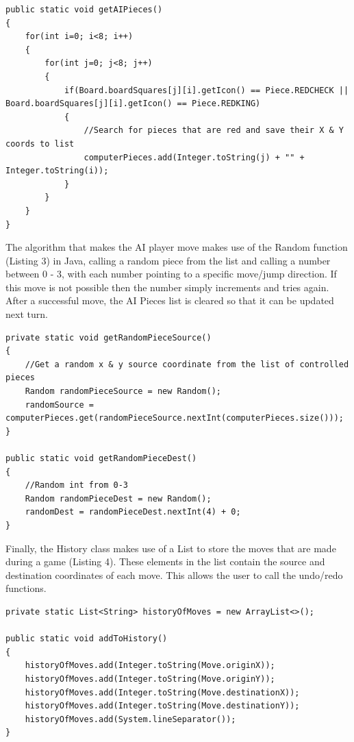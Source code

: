 \documentclass[10pt, a4paper]{article}
\begin{document}
\begin{lstlisting}[caption =  - getAIPieces Method - Fill a List with Coordinates of Any AI Controlled Pieces]
public static void getAIPieces()
{
	for(int i=0; i<8; i++)
	{
		for(int j=0; j<8; j++)
		{
			if(Board.boardSquares[j][i].getIcon() == Piece.REDCHECK || Board.boardSquares[j][i].getIcon() == Piece.REDKING)
			{
				//Search for pieces that are red and save their X & Y coords to list
				computerPieces.add(Integer.toString(j) + "" + Integer.toString(i));
			}
		}
	}
}
\end{lstlisting}

\newpage

The algorithm that makes the AI player move makes use of the Random function (Listing 3) in Java, calling a random piece from the list and calling a number between 0 - 3, with each number pointing to a specific move/jump direction.
\newline
If this move is not possible then the number simply increments and tries again. After a successful move, the AI Pieces list is cleared so that it can be updated next turn.

\begin{lstlisting}[caption =  - Methods for AI - Getting a Random Source \& Destination Coordinate]
private static void getRandomPieceSource()
{
	//Get a random x & y source coordinate from the list of controlled pieces
	Random randomPieceSource = new Random();
	randomSource =  computerPieces.get(randomPieceSource.nextInt(computerPieces.size()));
}

public static void getRandomPieceDest()
{
	//Random int from 0-3
	Random randomPieceDest = new Random();
	randomDest = randomPieceDest.nextInt(4) + 0;
}
\end{lstlisting}

\qquad

Finally, the History class makes use of a List to store the moves that are made during a game (Listing 4).
\newline
These elements in the list contain the source and destination coordinates of each move. This allows the user to call the undo/redo functions.

\begin{lstlisting}[caption =  - Methods for History List - Stores the Move Coordinates to the List]
private static List<String> historyOfMoves = new ArrayList<>();

public static void addToHistory()
{
	historyOfMoves.add(Integer.toString(Move.originX));
	historyOfMoves.add(Integer.toString(Move.originY));
	historyOfMoves.add(Integer.toString(Move.destinationX));
	historyOfMoves.add(Integer.toString(Move.destinationY));
	historyOfMoves.add(System.lineSeparator());
}
\end{lstlisting}
\end{document}
